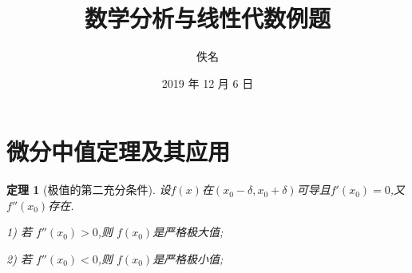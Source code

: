 \documentclass[UTF8,11pt]{ctexart}
\newtheorem{theorem}{定理}
\begin{document}
	\title{数学分析与线性代数例题}
	\author{佚名}
	\date{2019 年 12 月 6 日}
	\maketitle
	
	\tableofcontents
	\renewcommand{\baselinestretch}{1.8}

	\section{\songti 微分中值定理及其应用}
	\vspace{-1ex}
	    \begin{theorem}[极值的第二充分条件]
			 设$f(x)$在$(x_0-\delta,x_0+\delta)$可导且$f'(x_0)=0$,又$f''(x_0)$存在.
			 
			 1) 若 $f''(x_0)>0$,则 $f(x_0)$是严格极大值;

			 2) 若 $f''(x_0)<0$,则 $f(x_0)$是严格极小值;
	    \end{theorem}
\end{document}
